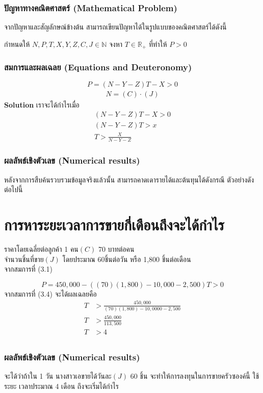 \documentclass{beamer}
\begin{document}
\begin{frame}
\frametitle{ปัญหาทางคณิตศาสตร์ (Mathematical Problem)}
จากปัญหาและสัญลักษณ์ข้างต้น สามารถเขียนปัญหาได้ในรูปแบบของคณิตศาสตร์ได้ดังนี้ \par
กำหนดให้ ${N,P,T,X,Y,Z,C,J}\in\mathbb{N}$ จงหา ${T}\in\mathbb{R_{+}}$ 
ที่ทำให้ $P>0$
\end{frame}

\begin{frame}
\frametitle{สมการและผลเฉลย (Equations and Deuteronomy)}
\begin{equation}
	P = (N - Y - Z)T - X > 0 
\end{equation}
\begin{align}
	N = (C)\cdot (J)
\end{align}
\textbf{Solution} เราจะได้กำไรเมื่อ
\begin{align}
	(N-Y-Z)T-X>0 \\
	(N-Y-Z)T>x \\
	T>\frac{X}{N-Y-Z} 
\end{align}
\end{frame}

\begin{frame}
\frametitle{ผลลัพธ์เชิงตัวเลข (Numerical results)}
หลังจากการสืบค้นรวบรวมข้อมูลจริงแล้วนั้น สามารถคาดเดารายได้และต้นทุนได้ดังกรณี
ตัวอย่างดังต่อไปนี้
\section{การหาระยะเวลาการขายกี่เดือนถึงจะได้กำไร}
ราคาโดยเฉลี่ยต่อลูกค้า 1 คน$(C)$ 70 บาทต่อคน \\
จำนวนชิ้นที่ขาย$(J)$ โดยประมาณ 60ชิ้นต่อวัน หรือ 1,800 ชิ้นต่อเดือน \\
จากสมการที่ (3.1)\par 
\begin{equation}
	P = 450,000-((70)(1,800) - 10,000 - 2,500)T > 0  
\end{equation}
จากสมการที่ (3.4) จะได้ผลเฉลยคือ
\begin{align*}
T &> \frac{450,000}{(70)(1,800) - 10,0000 - 2,500} \\
T &> \frac{450,000}{113,500} \\
T &> 4 \\
\end{align*}
\end{frame}

\begin{frame}
\frametitle{ผลลัพธ์เชิงตัวเลข (Numerical results)}
จะได้ว่าถ้าใน 1 วัน นางสาวเอขายได้วันละ$(J)$ 60 ชิ้น จะทำให้การลงทุนในการขายครัวซองค์นี้ ใช้ระยะ
เวลาประมาณ 4 เดือน ถึงจะเริ่มได้กำไร
\end{frame}
\end{document}
